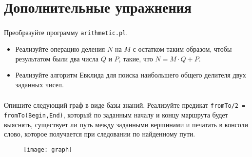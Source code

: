 
\section{Дополнительные упражнения}

\begin{frame}
	
	\frametitle{\insertsection}
	
	Преобразуйте программу \texttt{arithmetic.pl}.
	
	\begin{itemize}
		\item Реализуйте операцию деления \(N\) на \(M\) с остатком таким образом, чтобы результатом были два числа \(Q\) и \(P\), такие, что \(N = M\cdot Q + P \).
		\item Реализуйте алгоритм Евклида для поиска наибольшего общего делителя двух заданных чисел.
	\end{itemize}
	
\end{frame}

\begin{frame}
	\frametitle{\insertsection}
	Опишите следующий граф в виде базы знаний. Реализуйте предикат \texttt{fromTo/2 = fromTo(Begin,End)}, который по заданным началу и концу маршрута будет выяснять, существует ли путь между
	заданными вершинами и печатать в консоли слово, которое получается при следовании по найденному пути.
	
	\begin{figure}
		\texttt{[image: graph]}
	\end{figure}
\end{frame}

